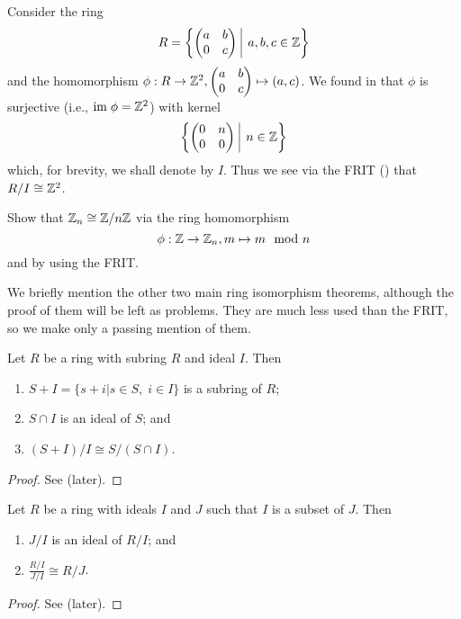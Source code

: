 \begin{example}
    Consider the ring
    \[
        R = \left\{\begin{pmatrix}a&b\\0&c\end{pmatrix}\vert a,b,c\in\Z\right\}
    \]
    and the homomorphism $\phi: R \to \mathbb{Z}^2, \begin{pmatrix}a&b\\0&c\end{pmatrix} \mapsto (a,c)$. We found in  that $\phi$ is surjective (i.e., $\mathrm{im}\;\phi = \mathbb{Z}^2$) with kernel
    \[
        \left\{\begin{pmatrix}0&n\\0&0\end{pmatrix} \vert n \in \Z\right\}
    \]
    which, for brevity, we shall denote by $I$. Thus we see via the FRIT () that $R/I \cong \mathbb{Z}^2$.
\end{example}
\begin{exercise}
    Show that $\mathbb{Z}_n \cong \mathbb{Z}/n\mathbb{Z}$ via the ring homomorphism
    \[
        \phi: \mathbb{Z} \to \mathbb{Z}_n, m \mapsto m \mod n
    \]
    and by using the FRIT.
\end{exercise}

We briefly mention the other two main ring isomorphism theorems, although the proof of them will be left as problems. They are much less used than the FRIT, so we make only a passing mention of them.
\begin{theorem}\label{thrm-ring-isomorphism-2}
    Let $R$ be a ring with subring $R$ and ideal $I$. Then
    \begin{enumerate}
        \item $S+I = \{s+i \vert s\in S,\;i\in I\}$ is a subring of $R$;
        \item $S \cap I$ is an ideal of $S$; and
        \item $(S+I)/I \cong S/(S\cap I)$.
    \end{enumerate}
\end{theorem}
\begin{proof}
    See  (later).
\end{proof}

\begin{theorem}\label{thrm-ring-isomorphism-3}
    Let $R$ be a ring with ideals $I$ and $J$ such that $I$ is a subset of $J$. Then
    \begin{enumerate}
        \item $J/I$ is an ideal of $R/I$; and
        \item $\frac{R/I}{J/I} \cong R/J$.
    \end{enumerate}
\end{theorem}
\begin{proof}
    See  (later).
\end{proof}

